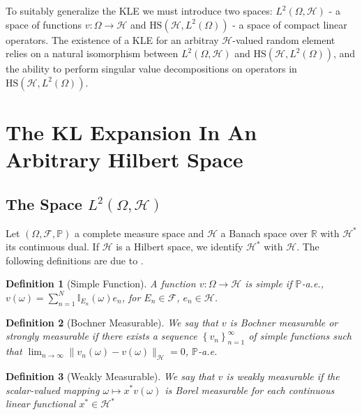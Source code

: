 \documentclass{article}
\numberwithin{theorem}{section}
\numberwithin{lemma}{section}
\newtheorem{definition}{Definition}
\numberwithin{definition}{section}
\numberwithin{assumption}{section}
\numberwithin{proposition}{section}
\numberwithin{remark}{section}
\numberwithin{corollary}{section}
\numberwithin{conjecture}{section}
\numberwithin{example}{section}
\newcommand{\R}{\mathbb{R}}
\newcommand{\bset}[1]{\left \lbrace #1 \right \rbrace}
\begin{document}
\begin{multicols*}{2}
To suitably generalize the KLE we must introduce two spaces: $L^2(\Omega, \mathcal H)$ - a space of functions $v: \Omega \to \mathcal H$ and $\text{HS}(\mathcal H, L^2(\Omega))$ - a space of compact linear operators. The existence of a KLE for an arbitray $\mathcal H$-valued random element relies on a natural isomorphism between $L^2(\Omega, \mathcal H)$ and $\text{HS}(\mathcal H, L^2(\Omega))$, and the ability to perform singular value decompositions on operators in $\text{HS}(\mathcal H, L^2(\Omega))$. 



\section{The KL Expansion In An Arbitrary Hilbert Space}
\subsection{The Space $L^2(\Omega, \mathcal H)$}



Let $(\Omega, \mathcal F, \mathbb P)$ a complete measure space and $\mathcal H$ a Banach space over $\R$ with $\mathcal H^*$ its continuous dual. If $\mathcal H$ is a Hilbert space, we identify $\mathcal H^*$ with $\mathcal H$. The following definitions are due to \cite{DiestelUhl1977}.

\begin{definition} [Simple Function] \label{Simple Definition}
    A function $v: \Omega \to \mathcal H$ is \textit{simple} if $\mathbb P$-a.e., $v(\omega) = \sum_{n=1}^N \mathbb I_{E_n}(\omega) e_n$, for $E_n \in \mathcal F$, $e_n \in \mathcal H$.
\end{definition}


\begin{definition} [Bochner Measurable]
 We say that $v$ is \textit{Bochner measurable} or \textit{strongly measurable} if there exists a sequence $\bset{v_n}_{n = 1}^\infty$ of simple functions such that $\lim_{n \to \infty} \|v_n(\omega) - v(\omega)\|_\mathcal H = 0$, $\mathbb P$-a.e.
\end{definition}

\begin{definition} [Weakly Measurable]
    We say that $v$ is weakly measurable if the scalar-valued mapping $\omega \mapsto x^*v(\omega)$ is Borel measurable for each continuous linear functional $x^* \in \mathcal H^*$ 
\end{definition}


\end{multicols*}
\end{document}
